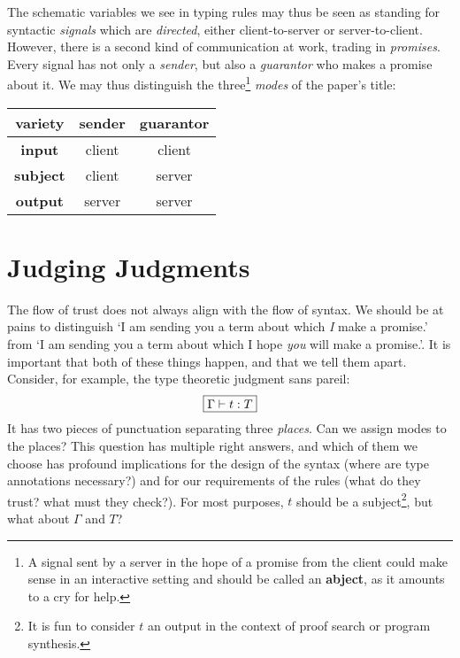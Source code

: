 \documentclass[format=acmsmall, screen, review, anonymous, timestamp]{acmart}
\begin{document}
The schematic variables we see in typing rules may thus be seen as
standing for syntactic \emph{signals} which are \emph{directed},
either client-to-server or server-to-client. However, there is a
second kind of communication at work, trading in
\emph{promises}. Every signal has not only a \emph{sender}, but also a
\emph{guarantor} who makes a promise about it. We may thus distinguish the
three\footnote{A signal sent by a server in the hope of a promise from
the client could make sense in an interactive setting and should be
called an \textbf{abject}, as it amounts to a cry for help.}
\emph{modes} of the paper's title:

\begin{center}
\begin{tabular}{c|cc}
  variety & sender & guarantor \\
  \hline
  \textbf{input} & client & client \\
  \textbf{subject} & client & server \\
  \textbf{output} & server & server \\
\end{tabular}
\end{center}


\section{Judging Judgments}

The flow of trust does not always align with the flow of
syntax. We should be at pains to distinguish `I am sending you a term
about which \emph{I} make a promise.' from `I am sending you a term
about which I hope \emph{you} will make a promise.'. It is
important that both of these things happen, and that we tell them
apart. Consider, for example, the type theoretic judgment sans pareil:
\[
\framebox{\(\Gamma \vdash t : T\)}
\]
It has two pieces of punctuation separating three \emph{places}. Can
we assign modes to the places? This question has multiple right
answers, and which of them we choose has profound implications for the
design of the syntax (where are type annotations necessary?) and for
our requirements of the rules (what do they trust? what must they
check?). For most purposes, $t$ should be a subject\footnote{It is fun
to consider $t$ an output in the context of proof search or program
synthesis.}, but what about $\Gamma$ and $T$?
\end{document}

